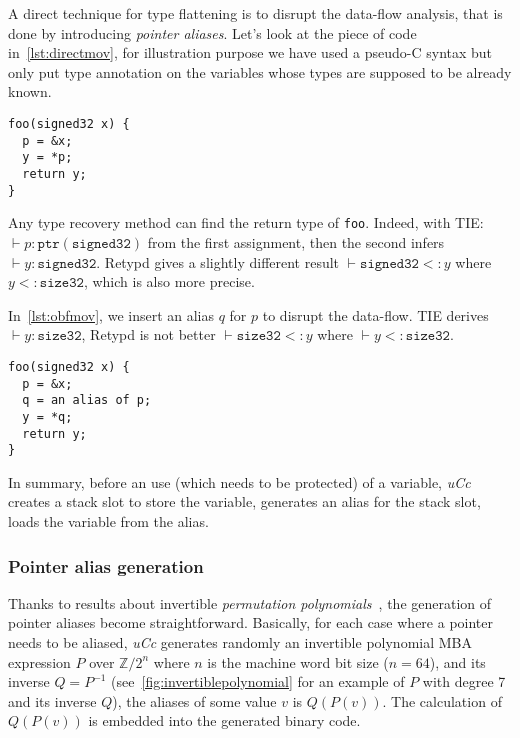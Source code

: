 \documentclass[compsoc,conference,a4paper,10pt,times]{IEEEtran}
\begin{document}
A direct technique for type flattening is to disrupt the data-flow analysis, that is done by
introducing \emph{pointer aliases}. Let's look at the
piece of code in~\cref{lst:directmov}, for illustration purpose we have used a pseudo-C syntax but only
put type annotation on the variables whose types are supposed to be already known.
\begin{lstlisting}[style={c},caption={Direct data movement},label={lst:directmov}]
foo(signed32 x) {
  p = &x;
  y = *p;
  return y;
}
\end{lstlisting}
Any type recovery method can find the return type of \texttt{foo}. Indeed,
with TIE: $\vdash p \colon \mathtt{ptr}(\mathtt{signed32})$ from the first assignment,
then the second infers $\vdash y \colon \mathtt{signed32}$. Retypd gives a slightly
different result $\vdash \mathtt{signed32} <\colon y$
where $y <\colon \mathtt{size32}$, which is also more precise.

In~\cref{lst:obfmov}, we insert an alias $q$ for $p$ to disrupt the data-flow.
TIE derives $\vdash y \colon \mathtt{size32}$, Retypd is not better
$\vdash \mathtt{size32} <\colon y$ where $\vdash y <\colon \mathtt{size32}$.
\begin{lstlisting}[style={c},caption={Data movement with pointer alias},label={lst:obfmov}]
foo(signed32 x) {
  p = &x;
  q = an alias of p;
  y = *q;
  return y;
}
\end{lstlisting}
In summary, before an use (which needs to be protected) of a
variable, \emph{uCc} \raisebox{.5pt}{\textcircled{\raisebox{-.9pt} {1}}} creates a stack slot to store the variable,
\raisebox{.5pt}{\textcircled{\raisebox{-.9pt} {2}}} generates an alias for the stack slot,
\raisebox{.5pt}{\textcircled{\raisebox{-.9pt} {3}}} loads the variable from the alias.

\subsubsection*{Pointer alias generation}
Thanks to results about invertible \emph{permutation polynomials}~\cite{zhou_information_2007}, the
generation of pointer aliases become straightforward. Basically, for each case where a pointer needs to
be aliased, \emph{uCc} generates randomly an invertible polynomial MBA expression $P$ over
$\mathbb{Z}/2^n$ where $n$ is the machine word bit size ($n = 64$), and its inverse $Q = P^{-1}$
(see~\cref{fig:invertiblepolynomial} for an example of $P$ with degree 7 and its inverse $Q$),
the aliases of some value $v$ is $Q(P(v))$. The calculation of $Q(P(v))$ is embedded into the generated
binary code.
\end{document}

